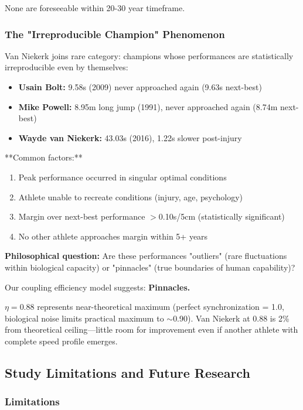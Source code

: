 None are foreseeable within 20-30 year timeframe.

\subsubsection{The "Irreproducible Champion" Phenomenon}

Van Niekerk joins rare category: champions whose performances are statistically irreproducible even by themselves:

\begin{itemize}
    \item \textbf{Usain Bolt:} 9.58s (2009) never approached again (9.63s next-best)
    \item \textbf{Mike Powell:} 8.95m long jump (1991), never approached again (8.74m next-best)
    \item \textbf{Wayde van Niekerk:} 43.03s (2016), 1.22s slower post-injury
\end{itemize}

**Common factors:**
\begin{enumerate}
    \item Peak performance occurred in singular optimal conditions
    \item Athlete unable to recreate conditions (injury, age, psychology)
    \item Margin over next-best performance $>$0.10s/5cm (statistically significant)
    \item No other athlete approaches margin within 5+ years
\end{enumerate}

\textbf{Philosophical question:} Are these performances "outliers" (rare fluctuations within biological capacity) or "pinnacles" (true boundaries of human capability)?

Our coupling efficiency model suggests: \textbf{Pinnacles.}

$\eta = 0.88$ represents near-theoretical maximum (perfect synchronization = 1.0, biological noise limits practical maximum to $\sim$0.90). Van Niekerk at 0.88 is 2\% from theoretical ceiling—little room for improvement even if another athlete with complete speed profile emerges.

\subsection{Study Limitations and Future Research}

\subsubsection{Limitations}

